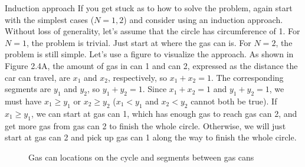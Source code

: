 \begin{solution}
\begin{concept}{Induction approach}
If you get stuck as to how to solve the problem, again start with the simplest cases ($N=1,2$) and consider using an induction approach. Without loss of generality, let's assume that the circle has circumference of 1. For $N=1$, the problem is trivial. Just start at where the gas can is. For $N=2$, the problem is still simple. Let's use a figure to visualize the approach. As shown in Figure 2.4A, the amount of gas in can 1 and can 2, expressed as the distance the car can travel, are $x_1$ and $x_2$, respectively, so $x_1+x_2=1$. The corresponding segments are $y_1$ and $y_2$, so $y_1+y_2=1$. Since $x_1+x_2=1$ and $y_1+y_2=1$, we must have $x_1\geq y_1$ or $x_2\geq y_2$ ($x_1<y_1$ and $x_2<y_2$ cannot both be true). If $x_1\geq y_1$, we can start at gas can 1, which has enough gas to reach gas can 2, and get more gas from gas can 2 to finish the whole circle. Otherwise, we will just start at gas can 2 and pick up gas can 1 along the way to finish the whole circle.

\end{concept}

\begin{figure}[ht]
\centering
{}
\caption{Gas can locations on the cycle and segments between gas cans}
\label{fig:zhou-figure-2-4}
\end{figure}


\end{solution}
